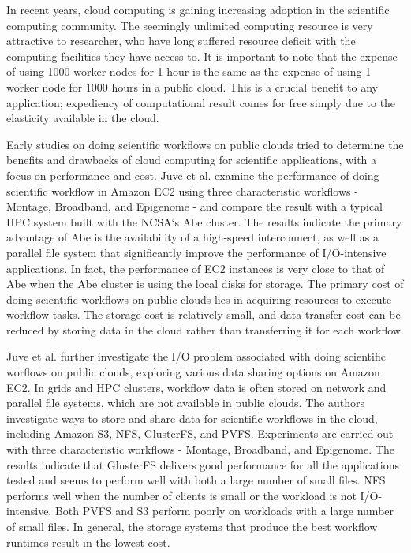 In recent years, cloud computing is gaining increasing adoption in the scientific computing community. The seemingly unlimited computing resource is very attractive to researcher, who have long suffered resource deficit with the computing facilities they have access to. It is important to note that the expense of using 1000 worker nodes for 1 hour is the same as the expense of using 1 worker node for 1000 hours in a public cloud. This is a crucial benefit to any application; expediency of computational result comes for free simply due to the elasticity available in the cloud.

Early studies on doing scientific workflows on public clouds tried to determine the benefits and drawbacks of cloud computing for scientific applications, with a focus on performance and cost. Juve et al. \cite{juve2009scientific} examine the performance of doing scientific workflow in Amazon EC2 using three characteristic workflows - Montage, Broadband, and Epigenome - and compare the result with a typical HPC system built with the NCSA`s Abe cluster. The results indicate the primary advantage of Abe is the availability of a high-speed interconnect, as well as a parallel file system that significantly improve the performance of I/O-intensive applications. In fact, the performance of EC2 instances is very close to that of Abe when  the Abe cluster is using the local disks for storage. The primary cost of doing scientific workflows on public clouds lies in acquiring resources to execute workflow tasks. The storage cost is relatively small, and data transfer cost can be reduced by storing data in the cloud rather than transferring it for each workflow.

Juve et al. \cite{juve2010data} \cite{juve2012evaluation} further investigate the I/O problem associated with doing scientific worflows on public clouds, exploring various data sharing options on Amazon EC2. In grids and HPC clusters, workflow data is often stored on network and parallel file systems, which are not available in public clouds. The authors investigate ways to store and share data for scientific workflows in the cloud, including Amazon S3, NFS, GlusterFS, and PVFS. Experiments are carried out with three characteristic workflows - Montage, Broadband, and Epigenome. The results indicate that GlusterFS delivers good performance for all the applications tested and seems to perform well with both a large number of small files. NFS performs well when the number of clients is small or the workload is not I/O-intensive. Both PVFS and S3 perform poorly on workloads with a large number of small files. In general, the storage systems that produce the best workflow runtimes result in the lowest cost.

